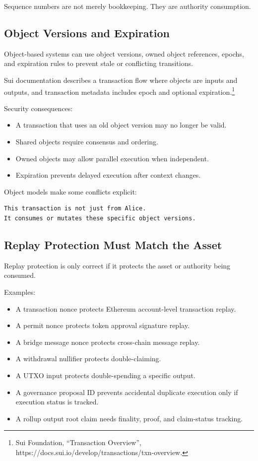Sequence numbers are not merely bookkeeping. They are authority
consumption.

\subsection{Object Versions and Expiration}

Object-based systems can use object versions, owned object references,
epochs, and expiration rules to prevent stale or conflicting
transitions.

Sui documentation describes a transaction flow where objects are inputs
and outputs, and transaction metadata includes epoch and optional
expiration.\footnote{Sui Foundation, ``Transaction Overview'',
  https://docs.sui.io/develop/transactions/txn-overview.}

Security consequences:

\begin{itemize}
\tightlist
\item
  A transaction that uses an old object version may no longer be valid.
\item
  Shared objects require consensus and ordering.
\item
  Owned objects may allow parallel execution when independent.
\item
  Expiration prevents delayed execution after context changes.
\end{itemize}

Object models make some conflicts explicit:

\begin{lstlisting}
This transaction is not just from Alice.
It consumes or mutates these specific object versions.
\end{lstlisting}

\subsection{Replay Protection Must Match the Asset}

Replay protection is only correct if it protects the asset or authority
being consumed.

Examples:

\begin{itemize}
\tightlist
\item
  A transaction nonce protects Ethereum account-level transaction
  replay.
\item
  A permit nonce protects token approval signature replay.
\item
  A bridge message nonce protects cross-chain message replay.
\item
  A withdrawal nullifier protects double-claiming.
\item
  A UTXO input protects double-spending a specific output.
\item
  A governance proposal ID prevents accidental duplicate execution only
  if execution status is tracked.
\item
  A rollup output root claim needs finality, proof, and claim-status
  tracking.
\end{itemize}

